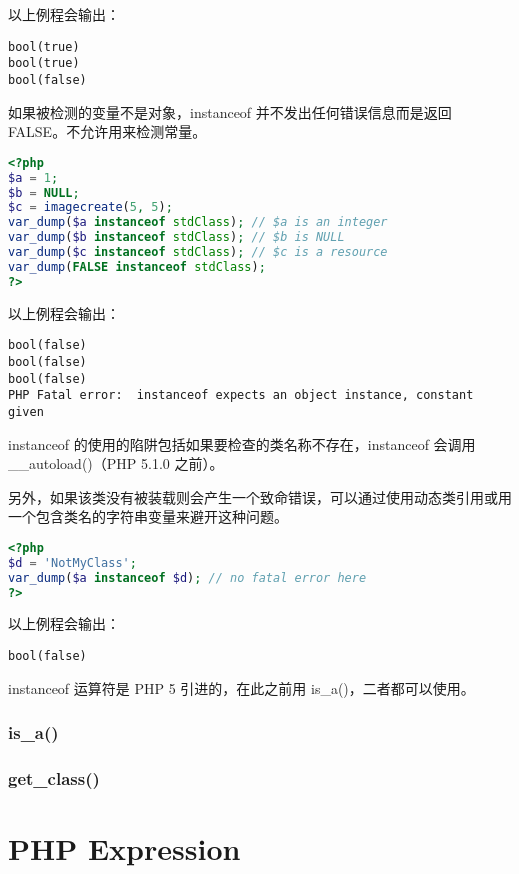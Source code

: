 以上例程会输出：

\begin{verbatim}
bool(true)
bool(true)
bool(false)
\end{verbatim}


如果被检测的变量不是对象，instanceof 并不发出任何错误信息而是返回 FALSE。不允许用来检测常量。

\begin{lstlisting}[language=PHP]
<?php
$a = 1;
$b = NULL;
$c = imagecreate(5, 5);
var_dump($a instanceof stdClass); // $a is an integer
var_dump($b instanceof stdClass); // $b is NULL
var_dump($c instanceof stdClass); // $c is a resource
var_dump(FALSE instanceof stdClass);
?>
\end{lstlisting}

以上例程会输出：

\begin{verbatim}
bool(false)
bool(false)
bool(false)
PHP Fatal error:  instanceof expects an object instance, constant given
\end{verbatim}


instanceof 的使用的陷阱包括如果要检查的类名称不存在，instanceof 会调用 \_\_autoload()（PHP 5.1.0 之前）。

另外，如果该类没有被装载则会产生一个致命错误，可以通过使用动态类引用或用一个包含类名的字符串变量来避开这种问题。

\begin{lstlisting}[language=PHP]
<?php
$d = 'NotMyClass';
var_dump($a instanceof $d); // no fatal error here
?>
\end{lstlisting}

以上例程会输出：

\begin{verbatim}
bool(false)
\end{verbatim}

instanceof 运算符是 PHP 5 引进的，在此之前用 is\_a()，二者都可以使用。

\subsection{is\_a()}


\subsection{get\_class()}




\chapter{PHP Expression}


